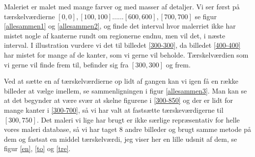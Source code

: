 Maleriet er malet med mange farver og med masser af detaljer. Vi ser
først på tærskelværdierne $[0,0],[100,100]......[600,600],[700,700]$ se
figur \ref{allesammen1} og \ref{allesammen2}, og finde det interval hvor
malerriet ikke har mistet nogle af kanterne rundt om regionerne endnu,
men vil det, i næste interval. I illustration vurdere vi det til
billedet \ref{300-300}, da billedet \ref{400-400} har mistet for mange
af de kanter, som vi gerne vil beholde. Tærskelværdien som vi gerne vil
finde frem til, befinder sig fra $[300,300]$ og frem. 

Ved at sætte en af tærskelværdierne op lidt af gangen kan vi igen få en
række billeder at vælge imellem, se sammenligningen i figur
\ref{allesammen3}. Man kan se at det begynder at være svær at skelne
figurene i \ref{300-850} og der er lidt for mange kanter i
\ref{300-700}, så vi har valt at fastsætte tærskeværdigerne til
$[300,750]$. Det maleri vi lige har brugt er ikke særlige repræsentativ
for helle vores maleri database, så vi har taget 8 andre billeder og
brugt samme metode på dem og fastsat en middel tærskelværdi, jeg viser
her en lille udsnit af dem, se figur \ref{en}, \ref{to} og \ref{tre}.

